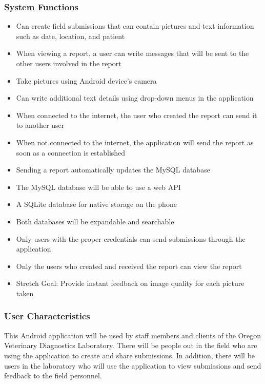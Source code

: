 \documentclass[onecolumn, draftclsnofoot,10pt, compsoc]{IEEEtran}
\begin{document}
\subsubsection{System Functions}

\begin{itemize}

\item Can create field submissions that can contain pictures and text information such as date, location, and patient

\item When viewing a report, a user can write messages that will be sent to the other users involved in the report

\item Take pictures using Android device's camera

\item Can write additional text details using drop-down menus in the application 

\item When connected to the internet, the user who created the report can send it to another user

\item When not connected to the internet, the application will send the report as soon as a connection is established

\item Sending a report automatically updates the MySQL database

\item The MySQL database will be able to use a web API

\item A SQLite database for native storage on the phone

\item Both databases will be expandable and searchable

\item Only users with the proper credentials can send submissions through the application

\item Only the users who created and received the report can view the report

\item Stretch Goal: Provide instant feedback on image quality for each picture taken

\end{itemize}

\subsubsection{User Characteristics}
This Android application will be used by staff members and clients of the Oregon Veterinary Diagnostics Laboratory. 
There will be people out in the field who are using the application to create and share submissions. 
In addition, there will be users in the laboratory who will use the application to view submissions and send feedback to the field personnel.
\end{document}
